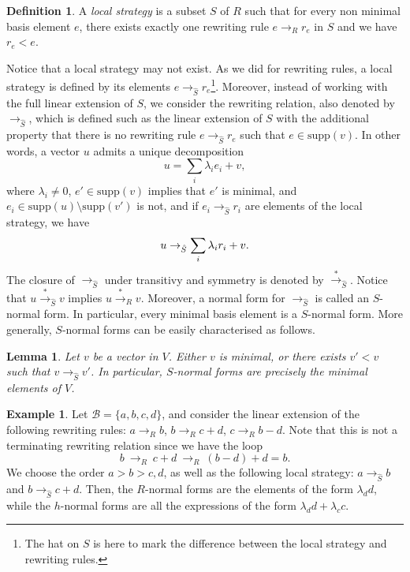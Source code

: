\documentclass[10pt]{easychair}
\newtheorem{lemma}[theorem]{Lemma}
\theoremstyle{definition}
\newtheorem{definition}[theorem]{Definition}
\newtheorem{example}[theorem]{Example}
\newcommand\supp{\text{supp}}
\newcommand\basis{\mathscr{B}}
\newcommand\rewR{\to_R}
\newcommand\rewS{\to_{\hat{S}}}
\newcommand\transR{\overset{*}{\to}_R}
\newcommand\transS{\overset{*}{\to}_{\hat{S}}}
\begin{document}
\begin{definition}
  A \emph{local strategy} is a subset $S$ of $R$ such that for every non
  minimal basis element $e$, there exists exactly one rewriting rule
  $e\rewR r_e$ in $S$ and we have $r_e<e$. 
\end{definition}
\smallskip

Notice that a local strategy may not exist. As we did for rewriting
rules, a local strategy is defined by its elements $e\rewS r_e$\footnote{
  The hat on $S$ is here to mark the difference between the local
  strategy and rewriting rules.}. Moreover, instead of working with the
full linear extension of $S$, we consider the rewriting relation, also
denoted by $\rewS$, which is defined such as the linear extension of $S$
with the additional property that there is no rewriting rule $e\rewS r_e$
such that $e\in\supp(v)$. In other words, a vector $u$ admits a unique
decomposition
\[u=\sum_i\lambda_ie_i+v,\]
where $\lambda_i\neq 0$, $e'\in\supp(v)$ implies that $e'$ is minimal,
and $e_i\in\supp(u)\setminus\supp(v')$ is not, and if $e_i\rewS r_i$ are
elements of the local strategy, we have 
\[u\rewS\sum_i\lambda_ir_i+v.
  \smallskip\]
The closure of $\rewS$ under transitivy and symmetry is denoted by
$\transS$. Notice that $u\transS v$ implies $u\transR v$. Moreover, a
normal form for $\rewS$ is called an $S$-normal form. In particular,
every minimal basis element is a $S$-normal form. More generally,
$S$-normal forms can be easily characterised as follows.
\medskip

\begin{lemma}\label{lem:h_normal_forms}
  Let $v$ be a vector in $V$. Either $v$ is minimal, or there exists
  $v'<v$ such that $v\rewS v'$. In particular, $S$-normal forms are
  precisely the minimal elements of $V$.
\end{lemma}
\smallskip

\begin{example}\label{ex:h_norma_form}
  Let $\basis=\{a,b,c,d\}$, and consider the linear extension of the
  following rewriting rules: $a\rewR b$, $b\rewR c+d$, $c\rewR b-d$. Note
  that this is not a terminating rewriting relation since we have the
  loop 
  \[b\ \rewR\ c+d\ \rewR\ (b-d)+d=b.\]
  We choose the order $a>b>c,d$, as well as the following local strategy:
  $a\rewS b$ and $b\rewS c+d$. Then, the $R$-normal forms are the
  elements of the form $\lambda_dd$, while the $h$-normal forms are all
  the expressions of the form $\lambda_dd+\lambda_cc$.
\end{example}
\smallskip
\end{document}
